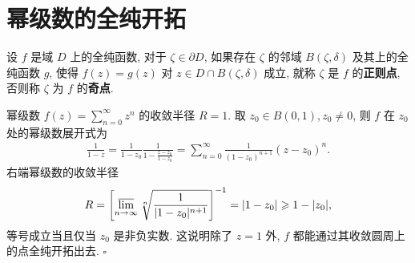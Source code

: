 \documentclass[../../main.tex]{subfiles}%
\begin{document}
\section{幂级数的全纯开拓}

\begin{definition}
设 \(f\) 是域 \(D\) 上的全纯函数, 对于 \(\zeta \in \partial D\), 如果存在 \(\zeta\) 的邻域 \(B(\zeta,\delta)\) 及其上的全纯函数 \(g\), 使得 \(f(z)=g(z)\) 对 \(z \in D \cap B(\zeta,\delta)\) 成立, 就称 \(\zeta\) 是 \(f\) 的\textbf{正则点}, 否则称 \(\zeta\) 为 \(f\) 的\textbf{奇点}.
\end{definition}

\begin{examples}
幂级数 \(f(z)=\sum\limits_{n=0}^{\infty} z^n\) 的收敛半径 \(R=1\). 取 \(z_0 \in B(0,1), z_0 \neq 0\), 则 \(f\) 在 \(z_0\) 处的幂级数展开式为
\begin{align*}
\frac{1}{1-z} = \frac{1}{1-z_0} \frac{1}{1-\frac{z-z_0}{1-z_0}} = \sum_{n=0}^{\infty} \frac{1}{(1-z_0)^{n+1}}(z-z_0)^n.
\end{align*}
右端幂级数的收敛半径
\begin{align*}
R = \left[ \varlimsup\limits_{n \to \infty} \sqrt[n]{\frac{1}{|1-z_0|^{n+1}}} \right]^{-1} 
= |1-z_0| 
\geqslant 1-|z_0|,
\end{align*}
等号成立当且仅当 \(z_0\) 是非负实数. 这说明除了 \(z=1\) 外, \(f\) 都能通过其收敛圆周上的点全纯开拓出去. \(\square\)
\end{examples}
\end{document}
